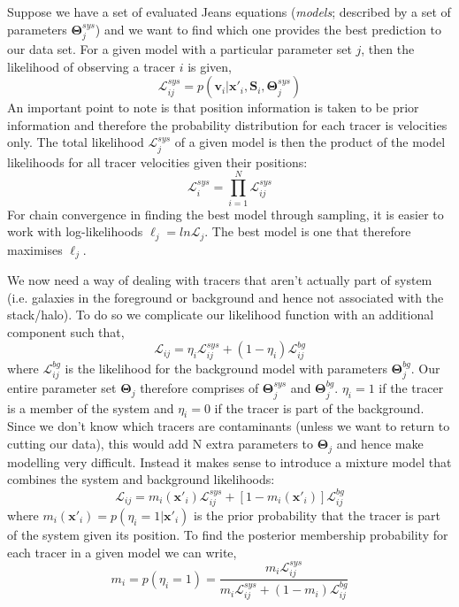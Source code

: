 Suppose we have a set of evaluated Jeans equations (\textit{models}; described by a set of parameters $\boldsymbol{\Theta}^{sys}_{j}$) and we want to find which one provides the best prediction to our data set. For a given model with a particular parameter set $j$, then the likelihood of observing a tracer $i$ is given, 
\begin{equation}
\mathcal{L}^{sys}_{ij} = p (\boldsymbol{v}_{i}|\boldsymbol{x}'_{i},\boldsymbol{S}_{i},\boldsymbol{\Theta}^{sys}_{j})
\end{equation}
An important point to note is that position information is taken to be prior information and therefore the probability distribution for each tracer is velocities only. The total likelihood $\mathcal{L}^{sys}_{j}$ of a given model is then the product of the model likelihoods for all tracer velocities given their positions:
\begin{equation}
\mathcal{L}^{sys}_{i} = \prod^{N}_{i=1} \mathcal{L}^{sys}_{ij}
\end{equation}
For chain convergence in finding the best model through sampling, it is easier to work with log-likelihoods $\ell_j = ln\mathcal{L}_{j}$. The best model is one that therefore maximises $\ell_j$. 

We now need a way of dealing with tracers that aren't actually part of system (i.e. galaxies in the foreground or background and hence not associated with the stack/halo). To do so we complicate our likelihood function with an additional component such that, 
\begin{equation}
\mathcal{L}_{ij} = \eta_{i}\mathcal{L}^{sys}_{ij} + (1-\eta_i)\mathcal{L}_{ij}^{bg}
\end{equation}
where $\mathcal{L}^{bg}_{ij}$ is the likelihood for the background model with parameters $\boldsymbol{\Theta}^{bg}_{j}$. Our entire parameter set $\boldsymbol{\Theta}_{j}$ therefore comprises of $\boldsymbol{\Theta}^{sys}_{j}$ and $\boldsymbol{\Theta}^{bg}_{j}$. $\eta_{i} = 1$ if the tracer is a member of the system and $\eta_{i} = 0$ if the tracer is part of the background. Since we don't know which tracers are contaminants (unless we want to return to cutting our data), this would add N extra parameters to $\boldsymbol{\Theta}_{j}$ and hence make modelling very difficult. Instead it makes sense to introduce a mixture model that combines the system and background likelihoods:
\begin{equation}
\mathcal{L}_{ij} = m_{i}(\boldsymbol{x}'_{i})\mathcal{L}^{sys}_{ij} + [1 - m_{i}(\boldsymbol{x}'_{i})]\mathcal{L}^{bg}_{ij}
\end{equation}
where $m_{i}(\boldsymbol{x}'_{i}) = p(\eta_{i} = 1| \boldsymbol{x}'_{i})$ is the prior probability that the tracer is part of the system given its position. To find the posterior membership probability for each tracer in a given model we can write,
\begin{equation}
m_{i} = p(\eta_i = 1) = \frac{m_{i}\mathcal{L}_{ij}^{sys}}{m_{i}\mathcal{L}_{ij}^{sys} + (1 - m_i)\mathcal{L}^{bg}_{ij}}
\end{equation}

